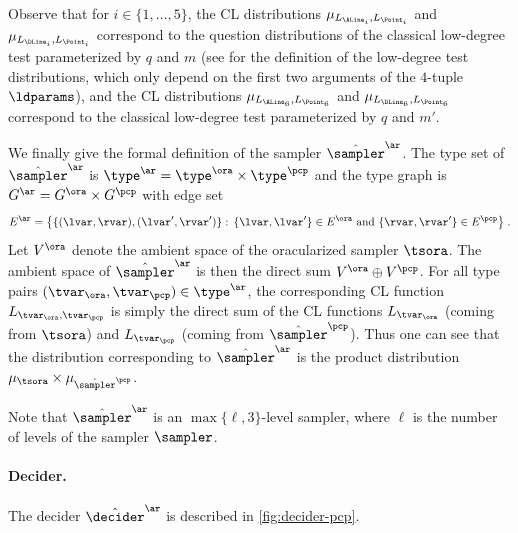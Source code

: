 Observe that for $i \in \{1,\ldots,5\}$, the CL distributions
$\mu_{L_{\ALine_i},L_{\Point_i}}$ and $\mu_{L_{\DLine_i},L_{\Point_i}}$ correspond to
the question distributions of the classical low-degree test parameterized by $q$
and $m$ (see  for the definition of the low-degree test
distributions, which only depend on the first two arguments of the $4$-tuple
$\ldparams$), and the CL distributions $\mu_{L_{\ALine_6},L_{\Point_6}}$ and
$\mu_{L_{\DLine_6},L_{\Point_6}}$ correspond to the classical low-degree test
parameterized by $q$ and $m'$.

We finally give the formal definition of the sampler $\tsans$.
The type set of $\tsans$ is $\type^\ar = \type^\ora \times \type^\pcp$ and the
type graph is $G^\ar = G^\ora \times G^\pcp$ with edge set
\begin{equation*}
  E^\ar = \bigl\{\{(\lvar,\rvar),(\lvar',\rvar')\}:\,
  \{\lvar, \lvar'\} \in E^\ora \text{ and } \{\rvar, \rvar'\} \in
  E^\pcp \bigr\}\;.
\end{equation*}
Let $V^\ora$ denote the ambient space of the oracularized sampler $\tsora$.
The ambient space of $\tsans$ is then the direct sum $V^\ora \oplus V^\pcp$.
For all type pairs $(\tvar_\ora,\tvar_\pcp) \in \type^\ar$, the corresponding CL
function $L_{\tvar_\ora,\tvar_\pcp}$ is simply the direct sum of the CL functions $L_{\tvar_\ora}$ (coming from $\tsora$) and
$L_{\tvar_\pcp}$ (coming from $\tspcp$).
Thus one can see that the distribution corresponding to $\tsans$ is the product
distribution $\mu_{\tsora} \times \mu_{\tspcp}$.

Note that $\tsans$ is an $\max\{ \ell, 3\}$-level sampler, where $\ell$ is the
number of levels of the sampler $\sampler$.







\paragraph{Decider.}
The decider $\tdans$ is described in \cref{fig:decider-pcp}.

